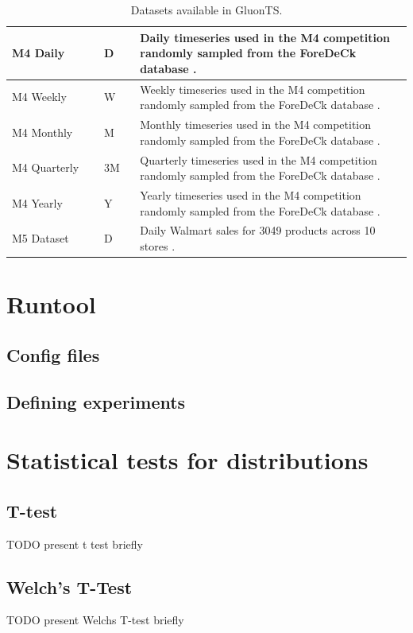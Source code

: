 \begin{table}[ht]
\begin{tabular}{p{0.23\linewidth} | p{0.09\linewidth} | p{0.68\linewidth}}
        \hline
        M4 Daily & D & Daily timeseries used in the M4 competition randomly sampled from the ForeDeCk database \cite{makridakis_m4_2020}.\\
        \hline
        M4 Weekly & W & Weekly timeseries used in the M4 competition randomly sampled from the ForeDeCk database \cite{makridakis_m4_2020}.\\
        \hline
        M4 Monthly & M & Monthly timeseries used in the M4 competition randomly sampled from the ForeDeCk database \cite{makridakis_m4_2020}.\\
        \hline
        M4 Quarterly & 3M & Quarterly timeseries used in the M4 competition randomly sampled from the ForeDeCk database \cite{makridakis_m4_2020}.\\
        \hline
        M4 Yearly & Y & Yearly timeseries used in the M4 competition randomly sampled from the ForeDeCk database \cite{makridakis_m4_2020}.\\
        \hline
        M5 Dataset & D & Daily Walmart sales for 3049 products across 10 stores \cite{gluonts-github, m5}. 
    \end{tabular}
    \caption{Datasets available in GluonTS.}
    \label{tab:datasets}
\end{table}

\section{Runtool}
\label{subsec:runtool}
\subsection{Config files}
\subsection{Defining experiments}

\section{Statistical tests for distributions}
\subsection{T-test}
\label{subsubsec:t-test}
TODO present t test briefly
\subsection{Welch's T-Test}
\label{subsubsec:welchs-t-test}
TODO present Welchs T-test briefly
